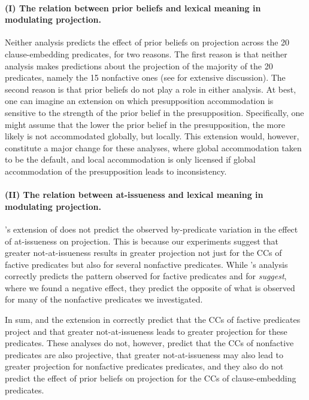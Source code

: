 \documentclass[11pt,fleqn]{article}
\newcommand{\6}{\mbox{$[\hspace*{-.6mm}[$}}
\newcommand{\9}{\mbox{$]\hspace*{-.6mm}]$}}
\newcommand{\citepos}[1]{\citeauthor{#1}'s \citeyear{#1}}
\begin{document}
\paragraph{(I) The relation between prior beliefs and lexical meaning in modulating projection.}
Neither analysis predicts the effect of prior beliefs on projection across the 20 clause-embedding predicates, for two reasons. The first reason is that neither analysis makes predictions about the projection of the majority of the 20 predicates, namely the 15 nonfactive ones (see \citealt{degen-tonhauser-language} for extensive discussion). The second reason is that prior beliefs do not play a role in either analysis. At best, one can imagine an extension on which presupposition accommodation is sensitive to the strength of the prior belief in the presupposition. Specifically, one might assume that the lower the prior belief in the presupposition, the more likely is not accommodated globally, but locally. This extension would, however, constitute a major change for these analyses, where global accommodation taken to be the default, and local accommodation is only licensed if global accommodation of the presupposition leads to inconsistency.

\paragraph{(II) The relation between at-issueness and lexical meaning in modulating projection.} \citepos{djaerv-bacovcin2020} extension of \citealt{heim83} does not predict the observed by-predicate variation in the effect of at-issueness on projection. This is because our experiments suggest that greater not-at-issueness results in greater projection not just for the CCs of factive predicates but also for several nonfactive predicates. While \citepos{djaerv-bacovcin2020} analysis correctly predicts the pattern observed for factive predicates and for {\em suggest}, where we found a negative effect, they predict the opposite of what is observed for many of the nonfactive predicates we investigated.

\bigskip

In sum, \citealt{heim83} and the extension in \citealt{djaerv-bacovcin2020} correctly predict that the CCs of factive predicates project and that greater not-at-issueness leads to greater projection for these predicates. These analyses do not, however, predict that the CCs of nonfactive predicates are also projective, that greater not-at-issueness may also lead to greater projection for nonfactive predicates predicates, and they also do not predict the effect of prior beliefs on projection for the CCs of clause-embedding predicates.
\end{document}
